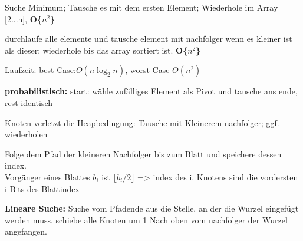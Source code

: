 Suche Minimum; Tausche es mit dem ersten Element; Wiederhole im Array [2...n], \textbf{ O\{$n^2$\}}

durchlaufe alle elemente und tausche element mit nachfolger wenn es kleiner ist als dieser; wiederhole bis das array sortiert ist. \textbf{O\{$n^2$\}}

Laufzeit: best Case:$O(n\log_2n)$, worst-Case $O(n^2)$

\textbf{probabilistisch:} start: wähle zufälliges Element als Pivot und tausche ans ende, rest identisch


Knoten verletzt die Heapbedingung: Tausche mit Kleinerem nachfolger; ggf. wiederholen

Folge dem Pfad der kleineren Nachfolger bis zum Blatt und speichere dessen index.\\ 
Vorgänger eines Blattes $b_i$ ist $\lfloor b_i /2 \rfloor $ => index des i. Knotens sind die vordersten i Bits des Blattindex

\textbf{Lineare Suche:}
Suche vom Pfadende aus die Stelle, an der die Wurzel eingefügt werden muss, schiebe alle Knoten um 1 Nach oben vom nachfolger der Wurzel angefangen.


